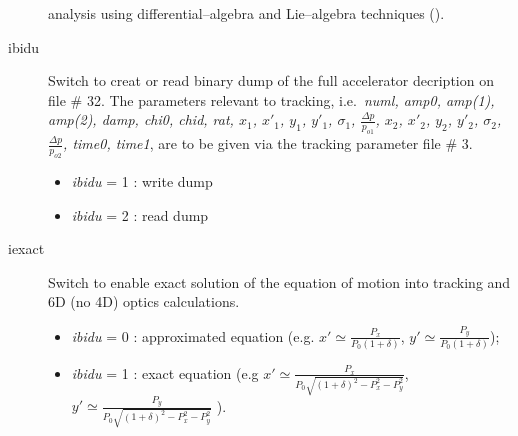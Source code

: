 \documentclass[a4paper,11pt]{report}
\begin{document}
\begin{description}
  analysis using differential--algebra and Lie--algebra techniques
  (\cite{Refine}).
\item [ibidu] Switch to creat or read binary dump of the full
  accelerator decription on file \# 32. The parameters relevant to
  tracking, i.e.\ {\em numl, amp0, amp(1), amp(2), damp, chi0, chid,
    rat, $x_1$, $x'_1$, $y_1$, $y'_1$, ${\sigma}_1$, $\frac{\Delta
      p}{p_{o1}}$, $x_2$, $x'_2$, $y_2$, $y'_2$, ${\sigma}_2$,
    $\frac{\Delta p}{p_{o2}}$, time0, time1}, are to be given via the
  tracking parameter file \# 3.
 \begin{itemize}
 \item {\em ibidu} \/= 1 : write dump
 \item {\em ibidu} \/= 2 : read dump
 \end{itemize}
\item [iexact] Switch to enable exact solution of the equation of motion into
  tracking and 6D (no 4D) optics calculations.
  \begin{itemize}
    \item {\em ibidu} \/= 0 : approximated equation
              (e.g. $x'\simeq \frac{P_x}{P_0(1+\delta)}$,
                    $y'\simeq \frac{P_y}{P_0(1+\delta)}$);
    \item {\em ibidu} \/= 1 : exact equation (e.g
      $x'\simeq \frac{P_x}{P_0\sqrt{(1+\delta)^2-P_x^2-P_y^2}}$,
      $y'\simeq \frac{P_y}{P_0\sqrt{(1+\delta)^2-P_x^2-P_y^2}}$ ).
 \end{itemize}
\end{description}
\end{document}
